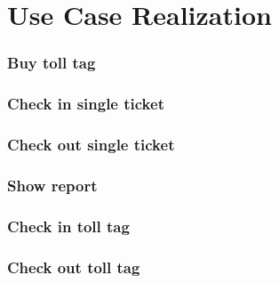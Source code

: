 \section {Use Case Realization}

\subsubsection{Buy toll tag}

\subsubsection{Check in single ticket}

\subsubsection{Check out single ticket}

\subsubsection{Show report}

\subsubsection{Check in toll tag}

\subsubsection{Check out toll tag}

